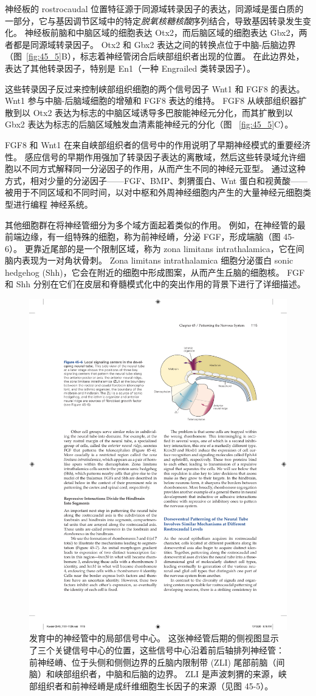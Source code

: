 神经板的 rostrocaudal 位置特征源于同源域转录因子的表达，同源域是蛋白质的一部分，它与基因调节区域中的特定\textit{脱氧核糖核酸}序列结合，导致基因转录发生变化。
神经板前脑和中脑区域的细胞表达 Otx2，而后脑区域的细胞表达 Gbx2，两者都是同源域转录因子。
Otx2 和 Gbx2 表达之间的转换点位于中脑-后脑边界（图~\ref{fig:45_5}B），标志着神经管闭合后峡部组织者出现的位置。
在此边界处，表达了其他转录因子，特别是 En1（一种 Engrailed 类转录因子）。


这些转录因子反过来控制峡部组织细胞的两个信号因子 Wnt1 和 FGF8 的表达。
Wnt1 参与中脑-后脑域细胞的增殖和 FGF8 表达的维持。
FGF8 从峡部组织器扩散到以 Otx2 表达为标志的中脑区域诱导多巴胺能神经元分化，而其扩散到以 Gbx2 表达为标志的后脑区域触发血清素能神经元的分化（图 ~\ref{fig:45_5}C）。


FGF8 和 Wnt1 在来自峡部组织者的信号中的作用说明了早期神经模式的重要经济性。
感应信号的早期作用强加了转录因子表达的离散域，然后这些转录域允许细胞以不同方式解释同一分泌因子的作用，从而产生不同的神经元亚型。
通过这种方式，相对少量的分泌因子——FGF、BMP、刺猬蛋白、Wnt 蛋白和视黄酸——被用于不同区域和不同时间，以对中枢和外周神经细胞内产生的大量神经元细胞类型进行编程 神经系统。


其他细胞群在将神经管细分为多个域方面起着类似的作用。
例如，在神经管的最前端边缘，有一组特殊的细胞，称为前神经嵴，分泌 FGF，形成端脑（图 45-6）。
更靠近尾部的是一个限制区域，称为 zona limitans intrathalamica，它在间脑内表现为一对角状骨刺。 Zona limitans intrathalamica 细胞分泌蛋白 sonic hedgehog (Shh)，它会在附近的细胞中形成图案，从而产生丘脑的细胞核。
FGF 和 Shh 分别在它们在皮层和脊髓模式化中的突出作用的背景下进行了详细描述。


\begin{figure}[htbp]
	\centering
	\includegraphics[width=0.6\linewidth]{chap45/fig_45_6}
	\caption{发育中的神经管中的局部信号中心。 这张神经管后期的侧视图显示了三个关键信号中心的位置，这些信号中心沿着前后轴排列神经管：前神经嵴、位于头侧和侧侧边界的丘脑内限制带 (ZLI) 尾部前脑（间脑）和峡部组织者，中脑和后脑的边界。 ZLI 是声波刺猬的来源，峡部组织者和前神经嵴是成纤维细胞生长因子的来源（见图 45-5）。}
	\label{fig:45_6}
\end{figure}



